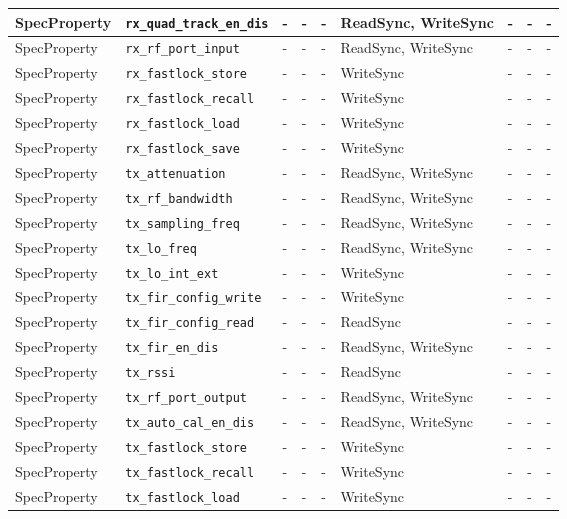 \documentclass{article}
\begin{document}
\begin{landscape}
\begin{scriptsize}
\begin{longtable}{|p{2cm}|p{4cm}|p{1cm}|p{2cm}|p{2cm}|p{2cm}|p{2cm}|p{1cm}|p{4.58cm}|}
			\hline
			SpecProperty & \verb+rx_quad_track_en_dis+ & - & - & - & ReadSync, WriteSync & - & - & - \\
			\hline
			SpecProperty & \verb+rx_rf_port_input+ & - & - & - & ReadSync, WriteSync & - & - & - \\
			\hline
			SpecProperty & \verb+rx_fastlock_store+ & - & - & - & WriteSync & - & - & - \\
			\hline
			SpecProperty & \verb+rx_fastlock_recall+ & - & - & - & WriteSync & - & - & - \\
			\hline
			SpecProperty & \verb+rx_fastlock_load+ & - & - & - & WriteSync & - & - & - \\
			\hline
			SpecProperty & \verb+rx_fastlock_save+ & - & - & - & WriteSync & - & - & - \\
			\hline
			SpecProperty & \verb+tx_attenuation+ & - & - & - & ReadSync, WriteSync & - & - & - \\
			\hline
			SpecProperty & \verb+tx_rf_bandwidth+ & - & - & - & ReadSync, WriteSync & - & - & - \\
			\hline
			SpecProperty & \verb+tx_sampling_freq+ & - & - & - & ReadSync, WriteSync & - & - & - \\
			\hline
			SpecProperty & \verb+tx_lo_freq+ & - & - & - & ReadSync, WriteSync & - & - & - \\
			\hline
			SpecProperty & \verb+tx_lo_int_ext+ & - & - & - & WriteSync & - & - & - \\
			\hline
			SpecProperty & \verb+tx_fir_config_write+ & - & - & - & WriteSync & - & - & - \\
			\hline
			SpecProperty & \verb+tx_fir_config_read+ & - & - & - & ReadSync  & - & - & - \\
			\hline
			SpecProperty & \verb+tx_fir_en_dis+ & - & - & - & ReadSync, WriteSync & - & - & - \\
			\hline
			SpecProperty & \verb+tx_rssi+ & - & - & - & ReadSync  & - & - & - \\
			\hline
			SpecProperty & \verb+tx_rf_port_output+ & - & - & - & ReadSync, WriteSync & - & - & - \\
			\hline
			SpecProperty & \verb+tx_auto_cal_en_dis+ & - & - & - & ReadSync, WriteSync & - & - & - \\
			\hline
			SpecProperty & \verb+tx_fastlock_store+ & - & - & - & WriteSync & - & - & - \\
			\hline
			SpecProperty & \verb+tx_fastlock_recall+ & - & - & - & WriteSync & - & - & - \\
			\hline
			SpecProperty & \verb+tx_fastlock_load+ & - & - & - & WriteSync & - & - & - \\

\end{longtable}
\end{scriptsize}
\end{landscape}
\end{document}
